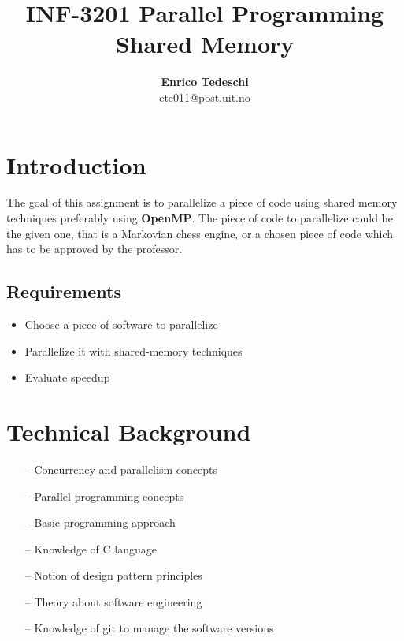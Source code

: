 \documentclass[11pt,conference]{IEEEtran}
\title{INF-3201 Parallel Programming
\newline
Shared Memory}
\author{\textbf{Enrico Tedeschi}\\ ete011@post.uit.no }
\begin{document}
\maketitle

\section{Introduction}
The goal of this assignment is to parallelize a piece of code using shared memory techniques preferably using \textbf{OpenMP}.
\newline
The piece of code to parallelize could be the given one, that is a Markovian chess engine, or a chosen piece of code which has to be approved by the professor.
\subsection{Requirements}
\begin{itemize} 
\item Choose a piece of software to parallelize
\item Parallelize it with shared-memory techniques
\item Evaluate speedup
\end{itemize}

\section{Technical Background}

\begin{itemize} 
\item[--] Concurrency and parallelism concepts
\item[--] Parallel programming concepts
\item[--] Basic programming approach
\item[--] Knowledge of C language
\item[--] Notion of design pattern principles
\item[--] Theory about software engineering
\item[--] Knowledge of git to manage the software versions
\end{itemize}
\end{document}
